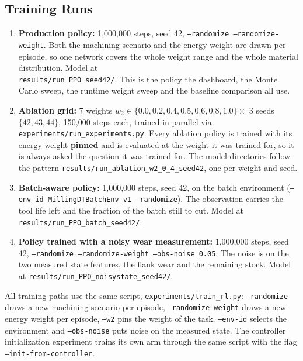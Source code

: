 \documentclass[11pt,a4paper]{article}
\begin{document}
\subsection{Training Runs}
\begin{enumerate}
    \item \textbf{Production policy:} 1,000,000 steps, seed 42, \texttt{--randomize --randomize-weight}. Both the machining scenario and the energy weight are drawn per episode, so one network covers the whole weight range and the whole material distribution. Model at\\
    \texttt{results/run\_PPO\_seed42/}. This is the policy the dashboard, the Monte Carlo sweep, the runtime weight sweep and the baseline comparison all use.
    \item \textbf{Ablation grid:} 7 weights $w_2 \in \{0.0, 0.2, 0.4, 0.5, 0.6, 0.8, 1.0\} \times$ 3 seeds $\{42,43,44\}$, 150,000 steps each, trained in parallel via \texttt{experiments/run\_experiments.py}. Every ablation policy is trained with its energy weight \textbf{pinned} and is evaluated at the weight it was trained for, so it is always asked the question it was trained for. The model directories follow the pattern \texttt{results/run\_ablation\_w2\_0\_4\_seed42}, one per weight and seed.
    \item \textbf{Batch-aware policy:} 1,000,000 steps, seed 42, on the batch environment (\texttt{--env-id MillingDTBatchEnv-v1 --randomize}). The observation carries the tool life left and the fraction of the batch still to cut. Model at \texttt{results/run\_PPO\_batch\_seed42/}.
    \item \textbf{Policy trained with a noisy wear measurement:} 1,000,000 steps, seed 42, \texttt{--randomize --randomize-weight --obs-noise 0.05}. The noise is on the two measured state features, the flank wear and the remaining stock. Model at \texttt{results/run\_PPO\_noisystate\_seed42/}.
\end{enumerate}

All training paths use the same script, \texttt{experiments/train\_rl.py}: \texttt{--randomize} draws a new machining scenario per episode, \texttt{--randomize-weight} draws a new energy weight per episode, \texttt{--w2} pins the weight of the task, \texttt{--env-id} selects the environment and \texttt{--obs-noise} puts noise on the measured state. The controller initialization experiment trains its own arm through the same script with the flag \texttt{--init-\allowbreak from-\allowbreak controller}.
\end{document}
